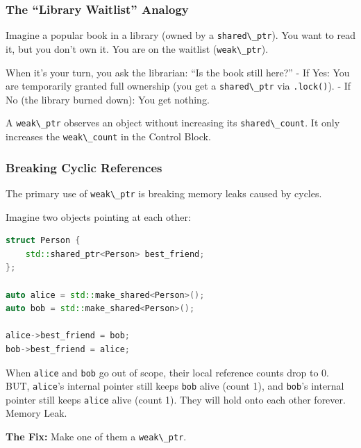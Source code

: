 \hypertarget{the-library-waitlist-analogy}{%
\subsubsection{The ``Library Waitlist''
Analogy}\label{the-library-waitlist-analogy}}

Imagine a popular book in a library (owned by a
\passthrough{\lstinline!shared\_ptr!}). You want to read it, but you
don't own it. You are on the waitlist
(\passthrough{\lstinline!weak\_ptr!}).

When it's your turn, you ask the librarian: ``Is the book still here?''
- If Yes: You are temporarily granted full ownership (you get a
\passthrough{\lstinline!shared\_ptr!} via
\passthrough{\lstinline!.lock()!}). - If No (the library burned down):
You get nothing.

A \passthrough{\lstinline!weak\_ptr!} observes an object without
increasing its \passthrough{\lstinline!shared\_count!}. It only
increases the \passthrough{\lstinline!weak\_count!} in the Control
Block.

\hypertarget{breaking-cyclic-references}{%
\subsubsection{Breaking Cyclic
References}\label{breaking-cyclic-references}}

The primary use of \passthrough{\lstinline!weak\_ptr!} is breaking
memory leaks caused by cycles.

Imagine two objects pointing at each other:

\begin{lstlisting}[language={C++}]
struct Person {
    std::shared_ptr<Person> best_friend;
};

auto alice = std::make_shared<Person>();
auto bob = std::make_shared<Person>();

alice->best_friend = bob;
bob->best_friend = alice;
\end{lstlisting}

When \passthrough{\lstinline!alice!} and \passthrough{\lstinline!bob!}
go out of scope, their local reference counts drop to 0. BUT,
\passthrough{\lstinline!alice!}'s internal pointer still keeps
\passthrough{\lstinline!bob!} alive (count 1), and
\passthrough{\lstinline!bob!}'s internal pointer still keeps
\passthrough{\lstinline!alice!} alive (count 1). They will hold onto
each other forever. Memory Leak.

\textbf{The Fix:} Make one of them a
\passthrough{\lstinline!weak\_ptr!}.

